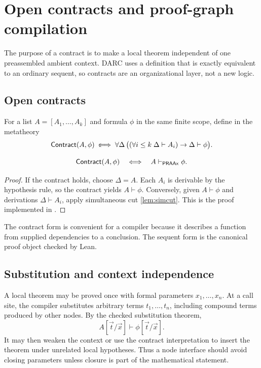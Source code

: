 \section{Open contracts and proof-graph compilation}
\label{sec:contracts}

The purpose of a contract is to make a local theorem independent of one
preassembled ambient context.  DARC uses a definition that is exactly
equivalent to an ordinary sequent, so contracts are an organizational layer,
not a new logic.

\subsection{Open contracts}

For a list \(A=[A_1,\ldots,A_k]\) and formula \(\phi\) in the same finite
scope, define in the metatheory
\[
  \mathsf{Contract}(A,\phi)
  \;:\!\!\Longleftrightarrow\;
  \forall\Delta\,
  \bigl((\forall i\le k\;\Delta\vdash A_i)
  \to \Delta\vdash\phi\bigr).
\]

\begin{theorem}
\label{thm:contract-sequent}
\[
  \mathsf{Contract}(A,\phi)
  \quad\Longleftrightarrow\quad
  A\vdash_{\mathsf{PRAAx}}\phi.
\]
\end{theorem}

\begin{proof}
If the contract holds, choose \(\Delta=A\).  Each \(A_i\) is derivable by the
hypothesis rule, so the contract yields \(A\vdash\phi\).  Conversely, given
\(A\vdash\phi\) and derivations \(\Delta\vdash A_i\), apply simultaneous cut
\cref{lem:simcut}.  This is the proof implemented in
.
\end{proof}

The contract form is convenient for a compiler because it describes a
function from supplied dependencies to a conclusion.  The sequent form is the
canonical proof object checked by Lean.

\subsection{Substitution and context independence}

A local theorem may be proved once with formal parameters
\(x_1,\ldots,x_n\).  At a call site, the compiler substitutes arbitrary terms
\(t_1,\ldots,t_n\), including compound terms produced by other nodes.  By the
checked substitution theorem,
\[
  A[\vec t/\vec x]\vdash\phi[\vec t/\vec x].
\]
It may then weaken the context or use the contract interpretation to insert
the theorem under unrelated local hypotheses.  Thus a node interface should
avoid closing parameters unless closure is part of the mathematical
statement.

